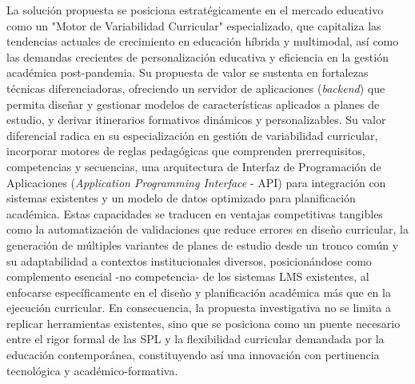 {{        La solución propuesta se posiciona estratégicamente en el mercado educativo
        como un "Motor de Variabilidad Curricular" especializado, que capitaliza las
        tendencias actuales de crecimiento en educación híbrida y multimodal, así
        como las demandas crecientes de personalización educativa y eficiencia en la
        gestión académica post-pandemia. Su propuesta de valor se sustenta en
        fortalezas técnicas diferenciadoras, ofreciendo un servidor de aplicaciones (\textit{backend}) que permita 
        diseñar y gestionar modelos de características aplicados a planes de estudio, 
        y derivar itinerarios formativos dinámicos y personalizables. Su valor diferencial
        radica en su especialización en gestión de variabilidad curricular, 
        incorporar motores de reglas pedagógicas que comprenden
        prerrequisitos, competencias y secuencias, una arquitectura de Interfaz de Programación de Aplicaciones (\textit{Application Programming Interface} - API) para integración con sistemas
        existentes y un modelo de datos optimizado para planificación académica.
        Estas capacidades se traducen en ventajas competitivas tangibles como la
        automatización de validaciones que reduce errores en diseño curricular, la
        generación de múltiples variantes de planes de estudio desde un tronco común y su
        adaptabilidad a contextos institucionales diversos, posicionándose como
        complemento esencial -no competencia- de los sistemas LMS existentes, al
        enfocarse específicamente en el diseño y planificación académica más que en
        la ejecución curricular. En consecuencia, la propuesta investigativa no se limita 
        a replicar herramientas existentes, sino que se posiciona como un puente necesario 
        entre el rigor formal de las \ac{SPL} y la flexibilidad curricular demandada por la educación 
        contemporánea, constituyendo así una innovación con pertinencia tecnológica y 
        académico-formativa.
    }

}
